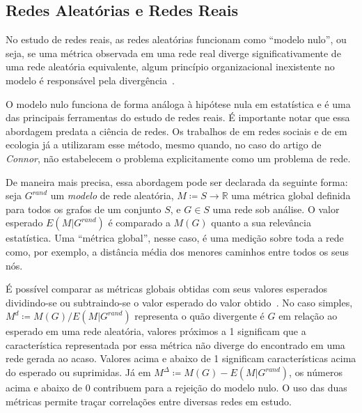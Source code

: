 \documentclass[12pt,a4paper]{article}
\theoremstyle{hypo}
\newcommand{\R}{\mathbb{R}} %
\newcommand{\defn}{\coloneqq} %
\begin{document}
\subsection{Redes Aleatórias e Redes Reais} \label{sec:redes-aleatorias}

No estudo de redes reais, as redes aleatórias funcionam como \enquote{modelo nulo}, ou seja, se uma métrica observada em uma rede real diverge significativamente de uma rede aleatória equivalente, algum princípio organizacional inexistente no modelo é responsável pela divergência~\cite{Zweig2016-rb}.

O modelo nulo funciona de forma análoga à hipótese nula em estatística e é uma das principais ferramentas do estudo de redes reais. É importante notar que essa abordagem predata a ciência de redes. Os trabalhos de  em redes sociais e de  em ecologia já a utilizaram esse método, mesmo quando, no caso do artigo de \textit{Connor}, não estabelecem o problema explicitamente como um problema de rede.

De maneira mais precisa, essa abordagem pode ser declarada da seguinte forma: seja $G^\textit{rand}$ um \textit{modelo} de rede aleatória, $M \defn S \to \R$ uma métrica global definida para todos os grafos de um conjunto $S$, e $G \in S$ uma rede sob análise. O valor esperado $E(M|G^\textit{rand})$ é comparado a $M(G)$ quanto a sua relevância estatística. Uma \enquote{métrica global}, nesse caso, é uma medição sobre toda a rede como, por exemplo, a distância média dos menores caminhos entre todos os seus nós.

É possível comparar as métricas globais obtidas com seus valores esperados dividindo-se ou subtraindo-se o valor esperado do valor obtido~\cite{Zweig2016-rb}. No caso simples, $M^d \defn M(G) / E(M|G^\textit{rand})$ representa o quão divergente é $G$ em relação ao esperado em uma rede aleatória, valores próximos a 1 significam que a característica representada por essa métrica não diverge do encontrado em uma rede gerada ao acaso. Valores acima e abaixo de 1 significam características acima do esperado ou suprimidas. Já em $M^\Delta \defn M(G) - E(M|G^\textit{rand})$, os números acima e abaixo de 0 contribuem para a rejeição do modelo nulo. O uso das duas métricas permite traçar correlações entre diversas redes em estudo.
\end{document}
